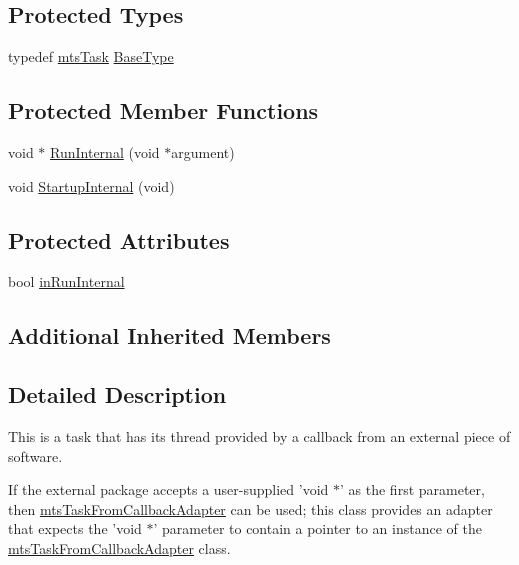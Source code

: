 \subsection*{Protected Types}
\begin{DoxyCompactItemize}
\item 
typedef \hyperlink{classmts_task}{mts\-Task} \hyperlink{classmts_task_from_callback_ab3e56b62478363211e93e97548fcac6f}{Base\-Type}
\end{DoxyCompactItemize}
\subsection*{Protected Member Functions}
\begin{DoxyCompactItemize}
\item 
void $\ast$ \hyperlink{classmts_task_from_callback_a595282bbeeeb168f4f585bee75c92df2}{Run\-Internal} (void $\ast$argument)
\item 
void \hyperlink{classmts_task_from_callback_ae1369f0e11b6d87d833d32548b7caafe}{Startup\-Internal} (void)
\end{DoxyCompactItemize}
\subsection*{Protected Attributes}
\begin{DoxyCompactItemize}
\item 
bool \hyperlink{classmts_task_from_callback_ab39ba4bafd286ab8fffbbee89de845f6}{in\-Run\-Internal}
\end{DoxyCompactItemize}
\subsection*{Additional Inherited Members}


\subsection{Detailed Description}
This is a task that has its thread provided by a callback from an external piece of software.

If the external package accepts a user-\/supplied 'void $\ast$' as the first parameter, then \hyperlink{classmts_task_from_callback_adapter}{mts\-Task\-From\-Callback\-Adapter} can be used; this class provides an adapter that expects the 'void $\ast$' parameter to contain a pointer to an instance of the \hyperlink{classmts_task_from_callback_adapter}{mts\-Task\-From\-Callback\-Adapter} class.

